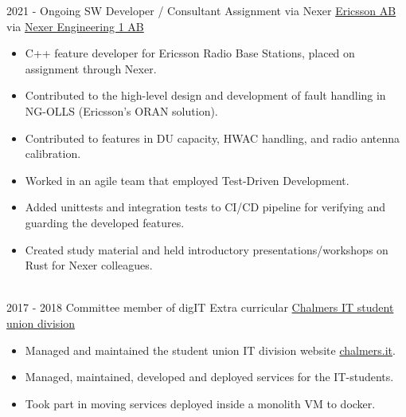 \documentclass[letterpaper]{twentysecondcv} %
\begin{document}
\begin{twenty} %
\twentyitem
        {2021 -}
        {Ongoing}
        {SW Developer / Consultant}
        {Assignment via Nexer}
        {\href{https://ericsson.com}{Ericsson AB} {\footnotesize via \href{https://nexergroup.com/sv/}{Nexer Engineering 1 AB}}}
        {\small
            \begin{itemize}
                \item C++ feature developer for Ericsson Radio Base Stations, placed on assignment through Nexer.
                \item Contributed to the high-level design and development of fault handling in NG-OLLS (Ericsson's ORAN solution).
                \item Contributed to features in DU capacity, HWAC handling, and radio antenna calibration.
                \item Worked in an agile team that employed Test-Driven Development.
                \item Added unittests and integration tests to CI/CD pipeline for verifying and guarding the developed features.
                \item Created study material and held introductory presentations/workshops on Rust for Nexer colleagues.\\
            \end{itemize}
                  
                
              
        }\\

\twentyitem
        {2017 - 2018}
        {}
        {Committee member of digIT}
        {Extra curricular}
        {\href{https://digit.chalmers.it}{Chalmers IT student union division}}
        {\small
                \begin{itemize}
                        \item Managed and maintained the student union IT division website \href{https://chalmers.it}{chalmers.it}.
                        \item Managed, maintained, developed and deployed services for the IT-students.
                        \item Took part in moving services deployed inside a monolith VM to docker.
                \end{itemize}
                  
        }

\end{twenty}
\end{document}

